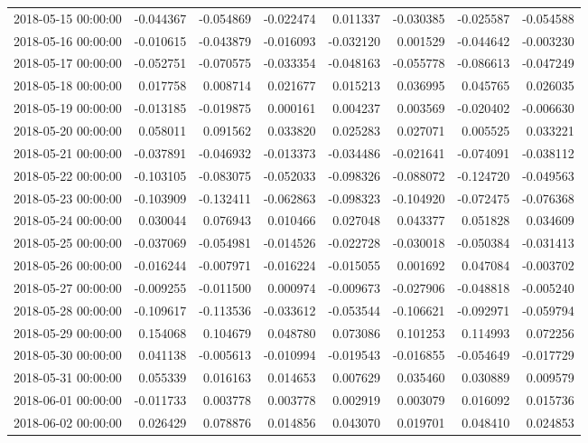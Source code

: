 \begin{tabular}{lrrrrrrr}
2018-05-15 00:00:00 & -0.044367 & -0.054869 & -0.022474 & 0.011337 & -0.030385 & -0.025587 & -0.054588 \\
2018-05-16 00:00:00 & -0.010615 & -0.043879 & -0.016093 & -0.032120 & 0.001529 & -0.044642 & -0.003230 \\
2018-05-17 00:00:00 & -0.052751 & -0.070575 & -0.033354 & -0.048163 & -0.055778 & -0.086613 & -0.047249 \\
2018-05-18 00:00:00 & 0.017758 & 0.008714 & 0.021677 & 0.015213 & 0.036995 & 0.045765 & 0.026035 \\
2018-05-19 00:00:00 & -0.013185 & -0.019875 & 0.000161 & 0.004237 & 0.003569 & -0.020402 & -0.006630 \\
2018-05-20 00:00:00 & 0.058011 & 0.091562 & 0.033820 & 0.025283 & 0.027071 & 0.005525 & 0.033221 \\
2018-05-21 00:00:00 & -0.037891 & -0.046932 & -0.013373 & -0.034486 & -0.021641 & -0.074091 & -0.038112 \\
2018-05-22 00:00:00 & -0.103105 & -0.083075 & -0.052033 & -0.098326 & -0.088072 & -0.124720 & -0.049563 \\
2018-05-23 00:00:00 & -0.103909 & -0.132411 & -0.062863 & -0.098323 & -0.104920 & -0.072475 & -0.076368 \\
2018-05-24 00:00:00 & 0.030044 & 0.076943 & 0.010466 & 0.027048 & 0.043377 & 0.051828 & 0.034609 \\
2018-05-25 00:00:00 & -0.037069 & -0.054981 & -0.014526 & -0.022728 & -0.030018 & -0.050384 & -0.031413 \\
2018-05-26 00:00:00 & -0.016244 & -0.007971 & -0.016224 & -0.015055 & 0.001692 & 0.047084 & -0.003702 \\
2018-05-27 00:00:00 & -0.009255 & -0.011500 & 0.000974 & -0.009673 & -0.027906 & -0.048818 & -0.005240 \\
2018-05-28 00:00:00 & -0.109617 & -0.113536 & -0.033612 & -0.053544 & -0.106621 & -0.092971 & -0.059794 \\
2018-05-29 00:00:00 & 0.154068 & 0.104679 & 0.048780 & 0.073086 & 0.101253 & 0.114993 & 0.072256 \\
2018-05-30 00:00:00 & 0.041138 & -0.005613 & -0.010994 & -0.019543 & -0.016855 & -0.054649 & -0.017729 \\
2018-05-31 00:00:00 & 0.055339 & 0.016163 & 0.014653 & 0.007629 & 0.035460 & 0.030889 & 0.009579 \\
2018-06-01 00:00:00 & -0.011733 & 0.003778 & 0.003778 & 0.002919 & 0.003079 & 0.016092 & 0.015736 \\
2018-06-02 00:00:00 & 0.026429 & 0.078876 & 0.014856 & 0.043070 & 0.019701 & 0.048410 & 0.024853 \\

\end{tabular}
